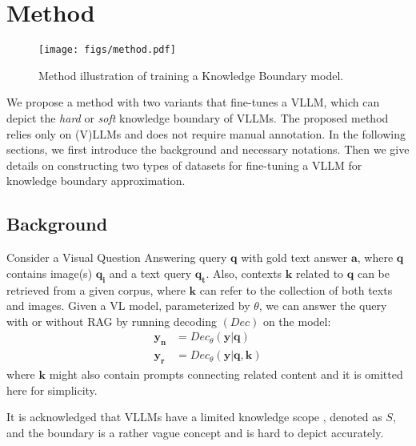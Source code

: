 \section{Method}
\label{method}

\begin{figure*}[tb]
\centering
\texttt{[image: figs/method.pdf]}
\caption{Method illustration of training a Knowledge Boundary model.}
\label{method_fig}
\end{figure*}


We propose a method with two variants that fine-tunes a VLLM, which can depict the \textit{hard} or \textit{soft} knowledge boundary of VLLMs. The proposed method relies only on (V)LLMs and does not require manual annotation. 
In the following sections, we first introduce the background and necessary notations. Then we give details on constructing two types of datasets for fine-tuning a VLLM for knowledge boundary approximation. 


\subsection{Background}
Consider a Visual Question Answering query $\bm{q}$ with gold text answer $\bm{a}$, where $\bm{q}$ contains image(s) $\bm{q_i}$ and a text query  $\bm{q_t}$. Also, contexts $\bm{k}$ related to $\bm{q}$ can be retrieved from a given corpus, where $\bm{k}$ can refer to the collection of both texts and images. Given a VL model, parameterized by $\theta$, we can answer the query with or without RAG by running decoding $(Dec)$ on the model:
\begin{equation}
\label{norag_all_rag}
    \begin{aligned}
    \bm{y_n} &= Dec_\theta(\bm{y}|\bm{q}) \\
    \bm{y_r} &= Dec_\theta(\bm{y}|\bm{q}, \bm{k})
    \end{aligned}
\end{equation}
where $\bm{k}$ might also contain prompts connecting related content and it is omitted here for simplicity.

It is acknowledged that VLLMs have a limited knowledge scope \cite{lin-byrne-2022-retrieval, wu2022multi}, denoted as $S$, and the boundary is a rather vague concept and is hard to depict accurately. %

